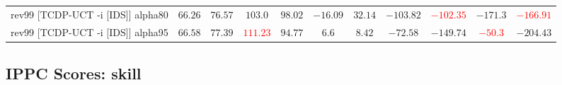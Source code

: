\documentclass{article}
\begin{document}
\begin{tabular}{|l|r@{$\pm$}rr@{$\pm$}rr@{$\pm$}rr@{$\pm$}rr@{$\pm$}rr@{$\pm$}rr@{$\pm$}rr@{$\pm$}rr@{$\pm$}rr@{$\pm$}r|}
\\
rev99 [TCDP-UCT -i [IDS]] alpha80
& \multicolumn{2}{c}{\textbf{$66.26$}}
& \multicolumn{2}{c}{$76.57$}
& \multicolumn{2}{c}{$103.0$}
& \multicolumn{2}{c}{$98.02$}
& \multicolumn{2}{c}{$-16.09$}
& \multicolumn{2}{c}{\textbf{$32.14$}}
& \multicolumn{2}{c}{$-103.82$}
& \multicolumn{2}{c}{\textbf{\textcolor{red}{$-102.35$}}}
& \multicolumn{2}{c}{$-171.3$}
& \multicolumn{2}{c|}{\textbf{\textcolor{red}{$-166.91$}}}
\\
rev99 [TCDP-UCT -i [IDS]] alpha95
& \multicolumn{2}{c}{\textbf{$66.58$}}
& \multicolumn{2}{c}{\textbf{$77.39$}}
& \multicolumn{2}{c}{\textbf{\textcolor{red}{$111.23$}}}
& \multicolumn{2}{c}{$94.77$}
& \multicolumn{2}{c}{\textbf{$6.6$}}
& \multicolumn{2}{c}{$8.42$}
& \multicolumn{2}{c}{$-72.58$}
& \multicolumn{2}{c}{$-149.74$}
& \multicolumn{2}{c}{\textbf{\textcolor{red}{$-50.3$}}}
& \multicolumn{2}{c|}{$-204.43$}
\\
\hline
\end{tabular}%

\bigskip

\subsection*{IPPC Scores: skill}
\end{document}
